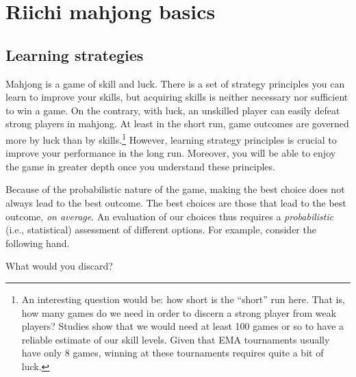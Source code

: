 \chapter{Riichi mahjong basics}\label{ch:basic}
\thispagestyle{empty}

\section{Learning strategies}

Mahjong is a game of skill and luck. 
There is a set of strategy principles you can learn to improve your skills, but acquiring skills is neither necessary nor sufficient to win a game. On the contrary, with luck, an unskilled player can easily defeat strong players in mahjong. At least in the short run, game outcomes are governed more by luck than by skills.\footnote{An interesting question would be: how short is the ``short'' run here. That is, how many games do we need in order to discern a strong player from weak players? Studies show that we would need at least 100 games or so to have a reliable estimate of our skill levels. Given that EMA tournaments usually have only 8 games, winning at these tournaments requires quite a bit of luck.}
However, learning strategy principles is crucial to improve your performance in the long run. Moreover, you will be able to enjoy the game in greater depth once you understand these principles. 

\bigskip
Because of the probabilistic nature of the game, making the best choice does not always lead to the best outcome. The best choices are those that lead to the best outcome, \emph{on average}. An evaluation of our choices thus requires a \emph{probabilistic} (i.e., statistical) assessment of different options. For example, consider the following hand. 
\vspace{5pt}
\begin{screen}
\bp
{}
\fa\fa\rfa
\ep
\vspace{-10pt}What would you discard? \vspace{-5pt}
\end{screen}


